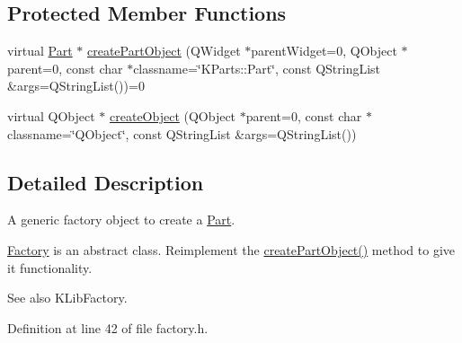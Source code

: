 \subsection*{\-Protected \-Member \-Functions}
\begin{DoxyCompactItemize}
\item 
virtual \hyperlink{classKParts_1_1Part}{\-Part} $\ast$ \hyperlink{classKParts_1_1Factory_a05e336b747b65776e31db466736570f2}{create\-Part\-Object} (\-Q\-Widget $\ast$parent\-Widget=0, \-Q\-Object $\ast$parent=0, const char $\ast$classname=\char`\"{}\-K\-Parts\-::\-Part\char`\"{}, const \-Q\-String\-List \&args=\-Q\-String\-List())=0
\item 
virtual \-Q\-Object $\ast$ \hyperlink{classKParts_1_1Factory_accec62e4a6f005b82cfad965cbeb1d7b}{create\-Object} (\-Q\-Object $\ast$parent=0, const char $\ast$classname=\char`\"{}\-Q\-Object\char`\"{}, const \-Q\-String\-List \&args=\-Q\-String\-List())
\end{DoxyCompactItemize}


\subsection{\-Detailed \-Description}
\-A generic factory object to create a \hyperlink{classKParts_1_1Part}{\-Part}.

\hyperlink{classKParts_1_1Factory}{\-Factory} is an abstract class. \-Reimplement the \hyperlink{classKParts_1_1Factory_a05e336b747b65776e31db466736570f2}{create\-Part\-Object()} method to give it functionality.

\begin{DoxySeeAlso}{\-See also}
\-K\-Lib\-Factory. 
\end{DoxySeeAlso}


\-Definition at line 42 of file factory.\-h.



